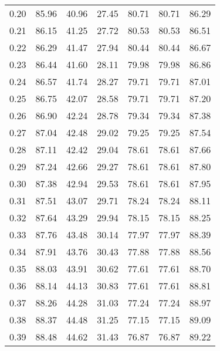 \begin{tabular}{|c|c|c|c|c|c|c|}
      0.20 &     85.96 &     40.96 &      27.45 &   80.71 &      80.71 &         86.29 \\
      0.21 &     86.15 &     41.25 &      27.72 &   80.53 &      80.53 &         86.51 \\
      0.22 &     86.29 &     41.47 &      27.94 &   80.44 &      80.44 &         86.67 \\
      0.23 &     86.44 &     41.60 &      28.11 &   79.98 &      79.98 &         86.86 \\
      0.24 &     86.57 &     41.74 &      28.27 &   79.71 &      79.71 &         87.01 \\
      0.25 &     86.75 &     42.07 &      28.58 &   79.71 &      79.71 &         87.20 \\
      0.26 &     86.90 &     42.24 &      28.78 &   79.34 &      79.34 &         87.38 \\
      0.27 &     87.04 &     42.48 &      29.02 &   79.25 &      79.25 &         87.54 \\
      0.28 &     87.11 &     42.42 &      29.04 &   78.61 &      78.61 &         87.66 \\
      0.29 &     87.24 &     42.66 &      29.27 &   78.61 &      78.61 &         87.80 \\
      0.30 &     87.38 &     42.94 &      29.53 &   78.61 &      78.61 &         87.95 \\
      0.31 &     87.51 &     43.07 &      29.71 &   78.24 &      78.24 &         88.11 \\
      0.32 &     87.64 &     43.29 &      29.94 &   78.15 &      78.15 &         88.25 \\
      0.33 &     87.76 &     43.48 &      30.14 &   77.97 &      77.97 &         88.39 \\
      0.34 &     87.91 &     43.76 &      30.43 &   77.88 &      77.88 &         88.56 \\
      0.35 &     88.03 &     43.91 &      30.62 &   77.61 &      77.61 &         88.70 \\
      0.36 &     88.14 &     44.13 &      30.83 &   77.61 &      77.61 &         88.81 \\
      0.37 &     88.26 &     44.28 &      31.03 &   77.24 &      77.24 &         88.97 \\
      0.38 &     88.37 &     44.48 &      31.25 &   77.15 &      77.15 &         89.09 \\
      0.39 &     88.48 &     44.62 &      31.43 &   76.87 &      76.87 &         89.22 \\

\end{tabular}
